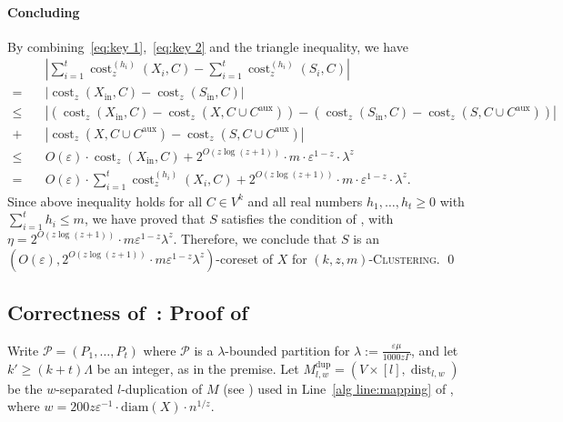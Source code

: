\documentclass[letterpaper,11pt]{article}
\theoremstyle{plain}
\theoremstyle{definition}
\theoremstyle{remark}
\DeclareMathOperator{\cost}{cost}
\DeclareMathOperator{\dist}{dist}
\newcommand{\diam}{\mathrm{diam}}
\newcommand{\dup}{\mathrm{dup}}
\newcommand{\inl}{\mathrm{in}}
\newcommand{\eps}{\varepsilon}
\newcommand{\calP}{\mathcal{P}}
\newcommand{\aux}{\mathrm{aux}}
\newcommand{\ProblemName}[1]{\textsc{#1}}
\newcommand{\kzmC}{\ProblemName{$(k,z,m)$-Clustering}\xspace}
\begin{document}
\paragraph{Concluding~}
By combining~\eqref{eq:key 1},~\eqref{eq:key 2} and the triangle inequality, we have
\begin{align*}
    \quad &\left| \sum_{i=1}^t\cost_z^{(h_i)}(X_i,C) - \sum_{i=1}^t\cost_z^{(h_i)}(S_i,C) \right|\\
    =\quad &\left|\cost_z(X_\inl,C) - \cost_z(S_\inl,C) \right|\\
    \le\quad &\left|\left(\cost_z(X_\inl,C) - \cost_z(X,C\cup C^\aux) \right) - \left(\cost_z(S_\inl,C) - \cost_z(S,C\cup C^\aux) \right) \right|\\
    +&\left|\cost_z(X,C\cup C^\aux) - \cost_z(S,C\cup C^\aux) \right| \\
    \le\quad& O(\eps)\cdot \cost_z(X_\inl,C) + 2^{O(z\log(z+1))}\cdot m\cdot \eps^{1-z}\cdot \lambda^z\\
    =\quad & O(\eps)\cdot \sum_{i=1}^t\cost_z^{(h_i)}(X_i,C) + 2^{O(z\log(z+1))}\cdot m\cdot \eps^{1-z}\cdot \lambda^z.
\end{align*}
Since above inequality holds for all $C\in V^k$ and all real numbers $h_1,\dots,h_t\ge 0$ with $\sum_{i=1}^th_i\le m$, we have proved that $S$ satisfies the condition of , with $\eta = 2^{O(z\log(z+1))}\cdot m\eps^{1-z}\lambda^z$. 
Therefore, we conclude that $S$ is an $(O(\eps),2^{O(z\log(z+1))}\cdot m\eps^{1-z}\lambda^z)$-coreset of $X$ for \kzmC.
\qed






 
\subsection{Correctness of~: Proof of~}
\label{sec:reduction for size_preserving}

\ReductionSizePreserving*

Write $\mathcal{P} = (P_1, \ldots, P_t)$ where $\calP$ is a $\lambda$-bounded partition for $\lambda := \frac{\eps\mu}{1000z\Gamma}$, and let $k'\ge (k+t)\Lambda$ be an integer, as in the premise.
Let $M^\dup_{l,w} = (V\times [l], \dist_{l,w})$ be the $w$-separated $l$-duplication of $M$ (see ) used in Line~\ref{alg line:mapping} of , where $w=200z\eps^{-1}\cdot \diam(X)\cdot n^{1/z}$. 
\end{document}
